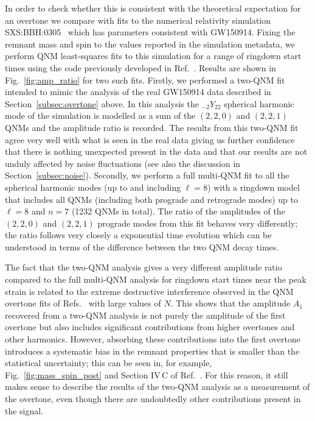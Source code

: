 In order to check whether this is consistent with the theoretical expectation for an overtone we compare with fits to the numerical relativity simulation SXS:BBH:0305~\cite{Lovelace:2016uwp} which has parameters consistent with GW150914.
Fixing the remnant mass and spin to the values reported in the simulation metadata, we perform QNM least-squares fits to this simulation for a range of ringdown start times using the code previously developed in Ref.~\cite{Finch:2021iip}.
Results are shown in Fig.~\ref{fig:amp_ratio} for two such fits. 
Firstly, we performed a two-QNM fit intended to mimic the analysis of the real GW150914 data described in Section~\ref{subsec:overtone} above. 
In this analysis the ${}_{-2}Y_{22}$ spherical harmonic mode of the simulation is modelled as a sum of the $(2,2,0)$ and $(2,2,1)$ QNMs and the amplitude ratio is recorded. 
The results from this two-QNM fit agree very well with what is seen in the real data giving us further confidence that there is nothing unexpected present in the data and that our results are not unduly affected by noise fluctuations (see also the discussion in Section~\ref{subsec:noise}). 
Secondly, we perform a full multi-QNM fit to all the spherical harmonic modes (up to and including $\ell = 8$) with a ringdown model that includes all QNMs (including both prograde and retrograde modes) up to $\ell = 8$ and $n = 7$ (1232 QNMs in total).
The ratio of the amplitudes of the $(2,2,0)$ and $(2,2,1)$ prograde modes from this fit behaves very differently; the ratio follows very closely a exponential time evolution which can be understood in terms of the difference between the two QNM decay times.

The fact that the two-QNM analysis gives a very different amplitude ratio compared to the full multi-QNM analysis for ringdown start times near the peak strain is related to the extreme destructive interference observed in the QNM overtone fits of Refs.~\cite{Giesler:2019uxc, Bhagwat:2019dtm, Ota:2019bzl, Cook:2020otn, JimenezForteza:2020cve, Dhani:2020nik, Finch:2021iip, Forteza:2021wfq, Dhani:2021vac, MaganaZertuche:2021syq} with large values of $N$.
This shows that the amplitude $A_1$ recovered from a two-QNM analysis is not purely the amplitude of the first overtone but also includes significant contributions from higher overtones and other harmonics. 
However, absorbing these contributions into the first overtone introduces a systematic bias in the remnant properties that is smaller than the statistical uncertainty; this can be seen in, for example, Fig.~\ref{fig:mass_spin_post} and Section IV\,C of Ref.~\cite{Giesler:2019uxc}. 
For this reason, it still makes sense to describe the results of the two-QNM analysis as a measurement of the overtone, even though there are undoubtedly other contributions present in the signal.


